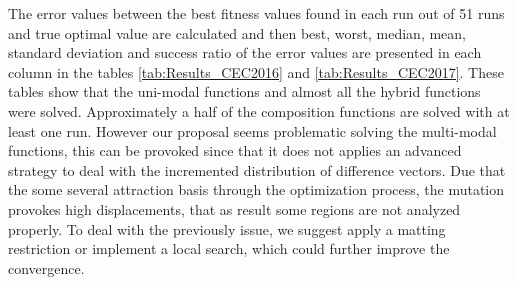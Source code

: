 
The error values between the best fitness values found in each run out of 51 runs and true optimal value are calculated and then best, worst, median, mean, standard deviation and success ratio of the error values are presented in each column in the tables \ref{tab:Results_CEC2016} and \ref{tab:Results_CEC2017}.
%
These tables show that the uni-modal functions and almost all the hybrid functions were solved.
%
Approximately a half of the composition functions are solved with at least one run.
%
However our proposal seems problematic solving the multi-modal functions, this can be provoked since that it does not applies an advanced strategy to deal with the incremented distribution of difference vectors.
%
Due that the \DEEDM{} some several attraction basis through the optimization process, the mutation provokes high displacements, that as result some regions are not analyzed properly.
%
To deal with the previously issue, we suggest apply a matting restriction or implement a local search, which could further improve the convergence.

